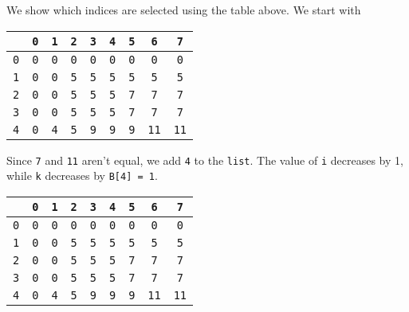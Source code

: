 \documentclass[a4paper, openany]{memoir}
\begin{document}
\noindent We show which indices are selected using the table above. We start with
\begin{center}
    \begin{tabular}{|c|c|c|c|c|c|c|c|c|}
        \hline
         & \texttt{0} & \texttt{1} & \texttt{2} & \texttt{3} & \texttt{4} & \texttt{5} & \texttt{6} & \texttt{7} \\
        \hline
        \texttt{0} & \texttt{0} & \texttt{0} & \texttt{0} & \texttt{0} & \texttt{0} & \texttt{0} & \texttt{0} & \texttt{0} \\
        \hline
        \texttt{1} & \texttt{0} & \texttt{0} & \texttt{5} & \texttt{5} & \texttt{5} & \texttt{5} & \texttt{5} & \texttt{5} \\
        \hline
        \texttt{2} & \texttt{0} & \texttt{0} & \texttt{5} & \texttt{5} & \texttt{5} & \texttt{7} & \texttt{7} & \texttt{7} \\
        \hline
        \texttt{3} & \texttt{0} & \texttt{0} & \texttt{5} & \texttt{5} & \texttt{5} & \texttt{7} & \texttt{7} & \texttt{\color{blue}7} \\
        \hline
        \texttt{4} & \texttt{0} & \texttt{4} & \texttt{5} & \texttt{9} & \texttt{9} & \texttt{9} & \texttt{11} &  \texttt{\color{red}11} \\
        \hline
    \end{tabular}
\end{center}
Since \texttt{7} and \texttt{11} aren't equal, we add \texttt{4} to the \texttt{list}. The value of \texttt{i} decreases by 1, while \texttt{k} decreases by \texttt{B[4] = 1}.
\begin{center}
    \begin{tabular}{|c|c|c|c|c|c|c|c|c|}
        \hline
         & \texttt{0} & \texttt{1} & \texttt{2} & \texttt{3} & \texttt{4} & \texttt{5} & \texttt{6} & \texttt{7} \\
        \hline
        \texttt{0} & \texttt{0} & \texttt{0} & \texttt{0} & \texttt{0} & \texttt{0} & \texttt{0} & \texttt{0} & \texttt{0} \\
        \hline
        \texttt{1} & \texttt{0} & \texttt{0} & \texttt{5} & \texttt{5} & \texttt{5} & \texttt{5} & \texttt{5} & \texttt{5} \\
        \hline
        \texttt{2} & \texttt{0} & \texttt{0} & \texttt{5} & \texttt{5} & \texttt{5} & \texttt{7} & \texttt{\color{blue}7} & \texttt{7} \\
        \hline
        \texttt{3} & \texttt{0} & \texttt{0} & \texttt{5} & \texttt{5} & \texttt{5} & \texttt{7} & \texttt{\color{red}7} & \texttt{7} \\
        \hline
        \texttt{4} & \texttt{0} & \texttt{4} & \texttt{5} & \texttt{9} & \texttt{9} & \texttt{9} & \texttt{11} &  \texttt{11} \\
        \hline
    \end{tabular}
\end{center}
\end{document}
